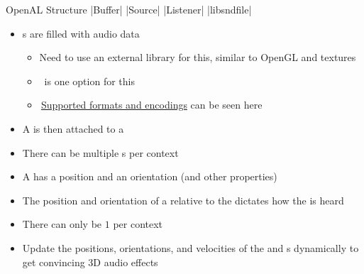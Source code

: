 \documentclass{beamer}
\newcommand{\hrefhand}[2]{\raisebox{-0.4ex}{\HandRight}\,\href{#1}{#2}}
\begin{document}
\begin{frame}[fragile]{OpenAL Structure}
    |Buffer|
    |Source|
    |Listener|
    |libsndfile|
    \begin{itemize}
        \item {\color{blue}}s are filled with audio data
              \begin{itemize}
                  \item Need to use an external library for this, similar to OpenGL and textures
                  \item \hrefhand{http://libsndfile.github.io/libsndfile/}{\color{blue}\UseVerb{libsndfile}} is one option for this
                  \item \hrefhand{http://libsndfile.github.io/libsndfile/formats.html}{\color{blue}Supported formats and encodings} can be seen here
              \end{itemize}
        \item A {\color{blue}} is then attached to a {\color{blue}}
        \item There can be multiple {\color{blue}}s per context
        \item A {\color{blue}} has a position and an orientation (and other properties)
        \item The position and orientation of a {\color{blue}} relative to the {\color{blue}
                      } dictates how the {\color{blue}} is heard
        \item There can only be $1$ {\color{blue}} per context
        \item Update the positions, orientations, and velocities of the {\color{blue}} and
                  {\color{blue}}s dynamically to get convincing 3D audio effects
    \end{itemize}
\end{frame}
\end{document}
